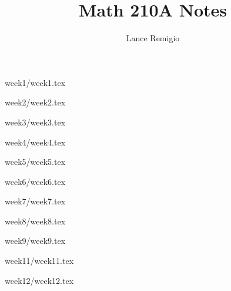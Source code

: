\documentclass[a4paper]{article}
\title{Math 210A Notes}
\author{Lance Remigio}
\begin{document}
\maketitle


{week1/week1.tex}

{week2/week2.tex}

{week3/week3.tex}

{week4/week4.tex}

{week5/week5.tex}

{week6/week6.tex}

{week7/week7.tex}

{week8/week8.tex} 

{week9/week9.tex}

{week11/week11.tex}

{week12/week12.tex}
\end{document}

